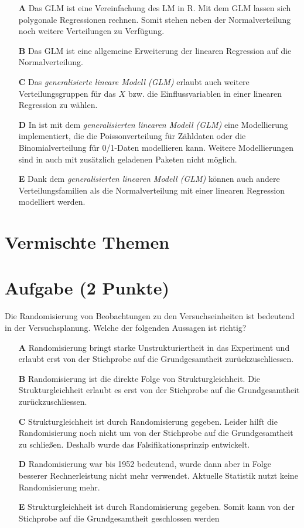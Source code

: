\documentclass[a4paper, 9pt]{scrartcl}\usepackage[]{graphicx}\usepackage[]{xcolor}
\begin{document}
\begin{enumerate}
\item [\textbf{A} \msquare] Das GLM ist eine Vereinfachung des LM in R. Mit dem GLM lassen sich polygonale Regressionen rechnen. Somit stehen neben der Normalverteilung noch weitere Verteilungen zu Verfügung.
\item [\textbf{B} \msquare] Das GLM ist eine allgemeine Erweiterung der linearen Regression auf die Normalverteilung.
\item [\textbf{C} \msquare] Das \textit{generalisierte lineare Modell (GLM)} erlaubt auch weitere Verteilungsgruppen für das $X$ bzw. die Einflussvariablen in einer linearen Regression zu wählen.
\item [\textbf{D} \msquare] In \Rlogo ist mit dem \textit{generalisierten linearen Modell (GLM)} eine Modellierung implementiert, die die Poissonverteilung für Zähldaten oder die Binomialverteilung für 0/1-Daten modellieren kann. Weitere Modellierungen sind in \Rlogo auch mit zusätzlich geladenen Paketen nicht möglich.
\item [\textbf{E} \msquare] Dank dem \textit{generalisierten linearen Modell (GLM)} können auch andere Verteilungsfamilien als die Normalverteilung mit einer linearen Regression modelliert werden.
\end{enumerate}
\section*{Vermischte Themen}  

\section{Aufgabe \hfill (2 Punkte)}

Die Randomisierung von Beobachtungen zu den Versuchseinheiten
ist bedeutend in der Versuchsplanung. Welche der folgenden Aussagen ist richtig?



\begin{enumerate}
\item [\textbf{A} \msquare] Randomisierung bringt starke Unstrukturiertheit in das Experiment und erlaubt erst von der Stichprobe auf die Grundgesamtheit zurückzuschliessen.
\item [\textbf{B} \msquare] Randomisierung ist die direkte Folge von Strukturgleichheit. Die Strukturgleichheit erlaubt es erst von der Stichprobe auf die Grundgesamtheit zurückzuschliessen.
\item [\textbf{C} \msquare] Strukturgleichheit ist durch Randomisierung gegeben. Leider hilft die Randomisierung noch nicht um von der Stichprobe auf die Grundgesamtheit zu schließen. Deshalb wurde das Falsifikationsprinzip entwickelt.
\item [\textbf{D} \msquare] Randomisierung war bis 1952 bedeutend, wurde dann aber in Folge besserer Rechnerleistung nicht mehr verwendet. Aktuelle Statistik nutzt keine Randomisierung mehr.
\item [\textbf{E} \msquare] Strukturgleichheit ist durch Randomisierung gegeben. Somit kann von der Stichprobe auf die Grundgesamtheit geschlossen werden
\end{enumerate}
\end{document}
